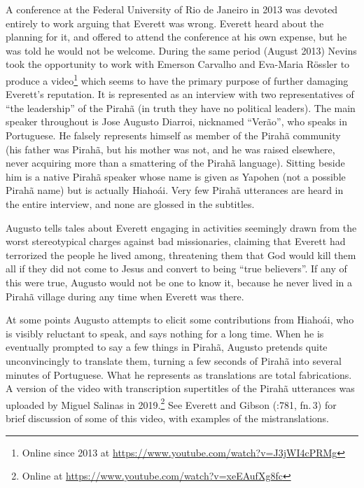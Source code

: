 \documentclass[output=paper,colorlinks,citecolor=brown
]{langscibook}
\begin{document}
A conference at the Federal University of Rio de Janeiro in 2013 was
devoted entirely to work arguing that Everett was wrong. Everett heard
about the planning for it, and offered to attend the conference at
his own expense, but he was told he would not be welcome. During the
same period (August 2013) Nevins took the opportunity to work with
Emerson Carvalho and Eva-Maria R{\"o}ssler to produce a video\footnote{%
   Online since 2013 at
   \url{https://www.youtube.com/watch?v=J3jWI4cPRMg}}
which seems to have the primary purpose of further damaging Everett's
reputation. It is represented as an interview with two representatives
of ``the leadership'' of the Pirah{\~a} (in truth they have no political
leaders). The main speaker throughout is Jose Augusto Diarroi, nicknamed
``Ver{\~a}o'', who speaks in Portuguese. He falsely represents himself as
member of the Pirah{\~a} community (his father was Pirah{\~a}, but
his mother was not, and he was raised elsewhere, never acquiring
more than a smattering of the Pirah{\~a} language). Sitting beside
him is a native Pirah{\~a} speaker whose name is given as Yapohen
(not a possible Pirah{\~a} name) but is actually Hiaho{\'a}i. Very
few Pirah{\~a} utterances are heard in the entire interview, and none
are glossed in the subtitles.

Augusto tells tales about Everett engaging in activities seemingly
drawn from the worst stereotypical charges against bad missionaries,
claiming that Everett had terrorized the people he lived among,
threatening them that God would kill them all if they did not come
to Jesus and convert to being ``true believers''. If any of this were
true, Augusto would not be one to know it, because he never lived in
a Pirah{\~a} village during any time when Everett was there.

At some points Augusto attempts to elicit some contributions from
Hiaho{\'a}i, who is visibly reluctant to speak, and says nothing for
a long time. When he is eventually prompted to say a few things in
Pirah{\~a}, Augusto pretends quite unconvincingly to translate them,
turning a few seconds of Pirah{\~a} into several minutes of Portuguese.
What he represents as translations are total fabrications. A version
of the video with transcription supertitles of the Pirah{\~a} utterances
was uploaded by Miguel Salinas in 2019.\footnote{%
   Online at \url{https://www.youtube.com/watch?v=xeEAufXg8fc}}
See Everett and Gibson (\citeyear{EverGibs19}:781, fn.\,3) for brief
discussion of some of this video, with examples of the mistranslations.
\end{document}
